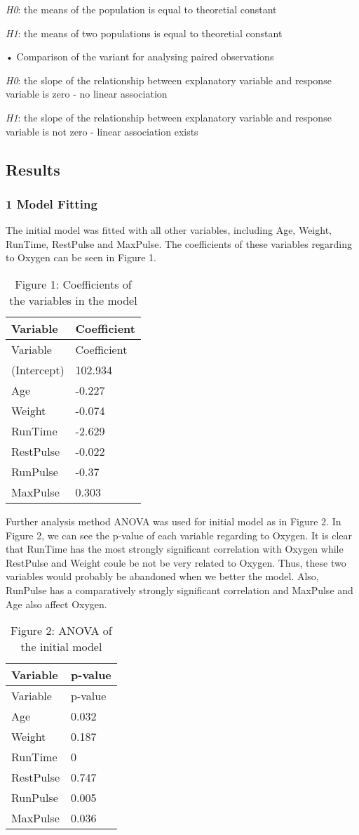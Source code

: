 \documentclass[]{article}
\begin{document}
\emph{H0}: the means of the population is equal to theoretial constant

\emph{H1}: the means of two populations is equal to theoretial constant

• Comparison of the variant for analysing paired observations

\emph{H0}: the slope of the relationship between explanatory variable
and response variable is zero - no linear association

\emph{H1}: the slope of the relationship between explanatory variable
and response variable is not zero - linear association exists

\pagebreak

\subsection{Results}\label{results}

\subsubsection{1 Model Fitting}\label{model-fitting}

The initial model was fitted with all other variables, including Age,
Weight, RunTime, RestPulse and MaxPulse. The coefficients of these
variables regarding to Oxygen can be seen in Figure 1.

\begin{longtable}[]{@{}ll@{}}
\caption{Figure 1: Coefficients of the variables in the
model}\tabularnewline
\toprule
Variable & Coefficient\tabularnewline
\midrule
\endfirsthead
\toprule
Variable & Coefficient\tabularnewline
\midrule
\endhead
(Intercept) & 102.934\tabularnewline
Age & -0.227\tabularnewline
Weight & -0.074\tabularnewline
RunTime & -2.629\tabularnewline
RestPulse & -0.022\tabularnewline
RunPulse & -0.37\tabularnewline
MaxPulse & 0.303\tabularnewline
\bottomrule
\end{longtable}

Further analysis method ANOVA was used for initial model as in Figure 2.
In Figure 2, we can see the p-value of each variable regarding to
Oxygen. It is clear that RunTime has the most strongly significant
correlation with Oxygen while RestPulse and Weight coule be not be very
related to Oxygen. Thus, these two variables would probably be abandoned
when we better the model. Also, RunPulse has a comparatively strongly
significant correlation and MaxPulse and Age also affect Oxygen.

\begin{longtable}[]{@{}ll@{}}
\caption{Figure 2: ANOVA of the initial model}\tabularnewline
\toprule
Variable & p-value\tabularnewline
\midrule
\endfirsthead
\toprule
Variable & p-value\tabularnewline
\midrule
\endhead
Age & 0.032\tabularnewline
Weight & 0.187\tabularnewline
RunTime & 0\tabularnewline
RestPulse & 0.747\tabularnewline
RunPulse & 0.005\tabularnewline
MaxPulse & 0.036\tabularnewline
\bottomrule
\end{longtable}
\end{document}
